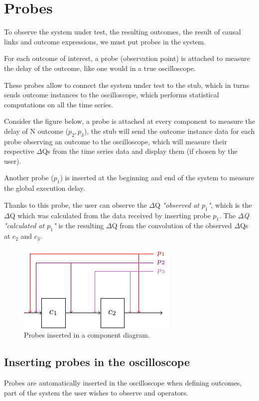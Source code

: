 \section{Probes}

To observe the system under test, the resulting outcomes, the result of causal links and outcome expressions, we must put probes in the system. 

For each outcome of interest, a probe (observation point) is attached to measure the delay of the outcome, like one would in a true oscilloscope. 

These probes allow to connect the system under test to the stub, which in turns sends outcome instances to the oscilloscope, which performs statistical computations on all the time series. 

Consider the figure below, a probe is attached at every component to measure the delay of N outcome ($p_2, p_3$), the stub will send the outcome instance data for each probe observing an outcome to the oscilloscope, which will measure their respective $\Delta$Qs from the time series data and display them (if chosen by the user). 

Another probe ($p_1$) is inserted at the beginning and end of the system to measure the global execution delay. 

Thanks to this probe, the user can observe the $\Delta$Q \textit{"observed at $p_1$"}, which is the $\Delta$Q which was calculated from the data received by inserting probe $p_1$. The \textit{$\Delta$Q "calculated at $p_1$"} is the resulting $\Delta$Q from the convolution of the observed $\Delta$Qs at $c_2$ and $c_3$.   
    \begin{figure}[H]
        \begin{center}
            \includegraphics[scale=1.8]{tikz/probes.pdf}
        \end{center}
        \label{fig:probes}
        \caption{Probes inserted in a component diagram.}
    \end{figure}

    \subsection{Inserting probes in the oscilloscope}
        Probes are automatically inserted in the oscilloscope when defining outcomes, part of the system the user wishes to observe and operators. 
        
